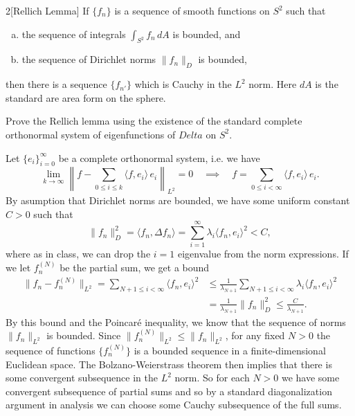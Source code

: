 \documentclass[expanded]{lkx_pset}
\begin{document}
\begin{problem}{2}[Rellich Lemma]
If $\{f_n\}$ is a sequence of smooth functions on $S^2$ such that
\begin{enumerate}[(a)]
	\item the sequence of integrals $\int_{S^2} f_n \,dA$ is bounded, and
	\item the sequence of Dirichlet norms $\|f_n\|_D$ is bounded,
\end{enumerate}
then there is a sequence $\{f_{n'}\}$ which is Cauchy in the $L^2$ norm. Here $dA$ is the standard are area form on the sphere.
\end{problem}

\begin{parts}
	\begin{part}{}
		Prove the Rellich lemma using the existence of the standard complete orthonormal system of eigenfunctions of $Delta$ on $S^2$.
	\end{part}

	Let $\{e_i\}_{i=0}^\infty$ be a complete orthonormal system, i.e. we have
	\[
		\lim_{k\to \infty}\left\|f - \sum_{0\leq i\leq k} \langle f, e_i\rangle\, e_i\right\|_{L^2}=0\quad\implies\quad f = \sum_{0\leq i<\infty} \langle f, e_i\rangle\, e_i.
	\]
	By asumption that Dirichlet norms are bounded, we have some uniform constant $C>0$ such that
	\[
		\|f_n\|^2_D = \langle f_n, \Delta f_n \rangle = \sum^\infty_{i=1}\lambda_i \langle f_n, e_i\rangle^2 < C,
	\]
	where as in class, we can drop the $i=1$ eigenvalue from the norm expressions. If we let $f^{(N)}_n$ be the partial sum, we get a bound
	\[
		\begin{aligned}
			\|f_n - f_n^{(N)}\|_{L^2} = \sum_{N+1\leq i < \infty} \langle f_n, e_i\rangle^2
			 & \leq \frac{1}{\lambda_{N+1}}\sum_{N+1\leq i < \infty}\lambda_i \langle f_n, e_i\rangle^2 \\
			 & = \frac{1}{\lambda_{N+1}}\|f_n\|_D^2 \leq \frac{C}{\lambda_{N+1}}.
		\end{aligned}
	\]
	By this bound and the Poincar\'e inequality, we know that the sequence of norms $\|f_n\|_{L^2}$ is bounded. Since $\|f_n^{(N)}\|_{L^2}\leq \|f_n\|_{L^2}$, for any fixed $N>0$ the sequence of functions $\{f_n^{(N)}\}$ is a bounded sequence in a finite-dimensional Euclidean space. The Bolzano-Weierstrass theorem then implies that there is some convergent subsequence in the $L^2$ norm. So for each $N>0$ we have some convergent subsequence of partial sums and so by a standard diagonalization argument in analysis we can choose some Cauchy subsequence of the full sums.
\end{parts}
\end{document}
